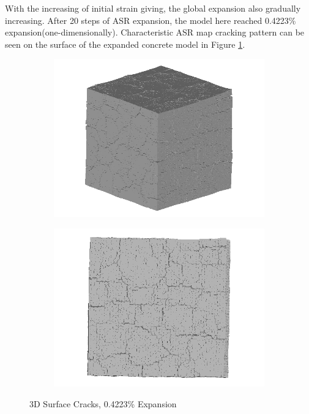 
With the increasing of initial strain giving, the global expansion also gradually increasing. After 20 steps of ASR expansion, the model here reached 0.4223\% expansion(one-dimensionally). Characteristic ASR map cracking pattern can be seen on the surface of the expanded concrete model in Figure \ref{fig:ASR_A30P75_3_3D_1}.

  \begin{figure}[ht]
  \centering
      \begin{subfigure}{.5\textwidth}
        \centering
        \includegraphics[width=.8\linewidth]{Files/exp_3D/ASR/A30P75_3_3d.png}
      \end{subfigure}%
      \begin{subfigure}{.5\textwidth}
        \centering
        \includegraphics[width=.8\linewidth]{Files/exp_3D/ASR/A30P75_3_3ds.png}
        \end{subfigure}
    \caption{3D Surface Cracks, 0.4223\% Expansion}
    \label{fig:ASR_A30P75_3_3D_1}
  \end{figure}

